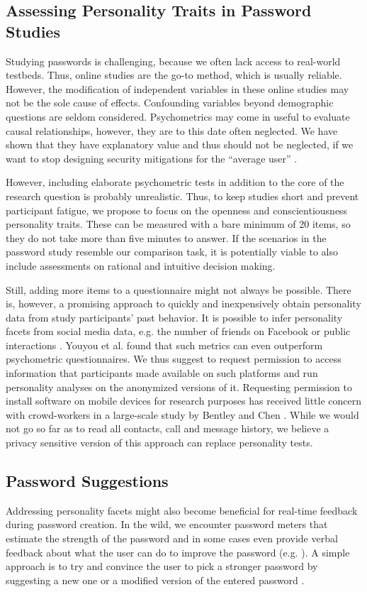 \subsection{Assessing Personality Traits in Password Studies}
Studying passwords is challenging, because we often lack access to real-world testbeds. Thus, online studies are the go-to method, which is usually reliable. However, the modification of independent variables in these online studies may not be the sole cause of effects. Confounding variables beyond demographic questions are seldom considered. Psychometrics may come in useful to evaluate causal relationships, however, they are to this date often neglected. We have shown that they have explanatory value and thus should not be neglected, if we want to stop designing security mitigations for the ``average user'' \cite{Egelman2015AverageUser}. 

However, including elaborate psychometric tests in addition to the core of the research question is probably unrealistic. Thus, to keep studies short and prevent participant fatigue, we propose to focus on the openness and conscientiousness personality traits. These can be measured with a bare minimum of 20 items, so they do not take more than five minutes to answer. If the scenarios in the password study resemble our comparison task, it is potentially viable to also include assessments on rational and intuitive decision making. 

Still, adding more items to a questionnaire might not always be possible. There is, however, a promising approach to quickly and inexpensively obtain personality data from study participants' past behavior. It is possible to infer personality facets from social media data, e.g. the number of friends on Facebook or public interactions \cite{Youyou2015Personality}. Youyou et al. found that such metrics can even outperform psychometric questionnaires. We thus suggest to request permission to access information that participants made available on such platforms and run personality analyses on the anonymized versions of it. Requesting permission to install software on mobile devices for research purposes has received little concern with crowd-workers in a large-scale study by Bentley and Chen \cite{Bentley2015Phonebook}. While we would not go so far as to read all contacts, call and message history, we believe a privacy sensitive version of this approach can replace personality tests.

\subsection{Password Suggestions}
Addressing personality facets might also become beneficial for real-time feedback during password creation. In the wild, we encounter password meters that estimate the strength of the password and in some cases even provide verbal feedback about what the user can do to improve the password (e.g. \cite{Wheeler2016zxcvbn}). A simple approach is to try and convince the user to pick a stronger password by suggesting a new one or a modified version of the entered password \cite{Forget2008ImprovingPasswordsThroughPersuasion, Seitz2016SuggestionsDecoy, Shay2015SpoonfulOfSugar}. 

